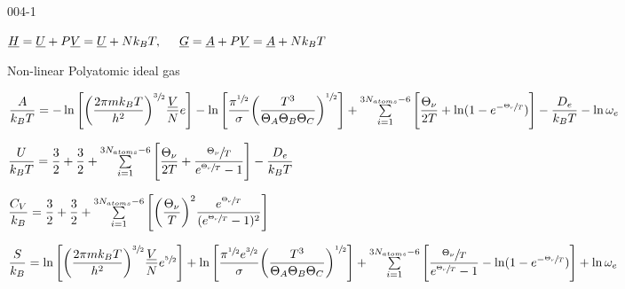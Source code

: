 \begin{mitframe}{004-1}
\begin{listone}
    \item $\uline{\enthalpy}=\uline{\intenergy}+\p\uline{\vol}=\uline{\intenergy}+\nummoles\boltz\Temp,\tab \uline{\gibbs}=\uline{\helmholtz}+\p\uline{\vol}=\uline{\helmholtz}+\nummoles\boltz\Temp$
    
            
    \item Non-linear Polyatomic ideal gas 
       
   	\item $\dfrac{\helmholtz}{\boltz\Temp}=-\ln\Bigg[\bigg(\dfrac{2\pie\mass\boltz\Temp}{\planck^{2}}\bigg)^{\sfrac{3}{2}}\dfrac{\uline{\vol}}{\nummoles}\e\Bigg]-\ln\Bigg[\dfrac{\pie^{\sfrac{1}{2}}}{\molecrad}\bigg(\dfrac{\Temp^{3}}{\dimltemp_{A}\dimltemp_{B}\dimltemp_{C}}\bigg)^{\sfrac{1}{2}}\Bigg]+\sum\limits_{i=1}^{3\nummoles_{atoms}-6}\Bigg[\dfrac{\vibrfreqfac}{2\Temp}+\ln(1-e^{-\sfrac{\vibrfreqfac}{\Temp}})\Bigg]-\dfrac{\eneatom}{\boltz\Temp}-\ln\elecdegen$
    
    
    \item $\dfrac{\intenergy}{\boltz\Temp}=\dfrac{3}{2}+\dfrac{3}{2}+\sum\limits_{i=1}^{3\nummoles_{atoms}-6}\Bigg[\dfrac{\vibrfreqfac}{2\Temp}+\dfrac{\sfrac{\vibrfreqfac}{\Temp}}{\e^{\sfrac{\vibrfreqfac}{\Temp}}-1}\Bigg]-\dfrac{\eneatom}{\boltz\Temp}$
    
    \item $\dfrac{\cv}{\boltz}=\dfrac{3}{2}+\dfrac{3}{2}+\sum\limits_{i=1}^{3\nummoles_{atoms}-6}\Bigg[\bigg(\dfrac{\vibrfreqfac}{\Temp}\bigg)^{2}\dfrac{\e^{\sfrac{\vibrfreqfac}{\Temp}}}{(\e^{\sfrac{\vibrfreqfac}{\Temp}}-1)^{2}}\Bigg]$
    
    \item $\dfrac{\entropy}{\boltz}=\ln\Bigg[\bigg(\dfrac{2\pie\mass\boltz\Temp}{\planck^{2}}\bigg)^{\sfrac{3}{2}}\dfrac{\uline{\vol}}{\nummoles}\e^{\sfrac{5}{2}}\Bigg]+\ln\Bigg[\dfrac{\pie^{\sfrac{1}{2}}\e^{\sfrac{3}{2}}}{\molecrad}\bigg(\dfrac{\Temp^{3}}{\dimltemp_{A}\dimltemp_{B}\dimltemp_{C}}\bigg)^{\sfrac{1}{2}}\Bigg]+\sum\limits_{i=1}^{3\nummoles_{atoms}-6}\Bigg[\dfrac{\sfrac{\vibrfreqfac}{\Temp}}{\e^{\sfrac{\vibrfreqfac}{\Temp}}-1}-\ln(1-\e^{-\sfrac{\vibrfreqfac}{\Temp}})\Bigg]+\ln\elecdegen$          


\end{listone}
\end{mitframe}
